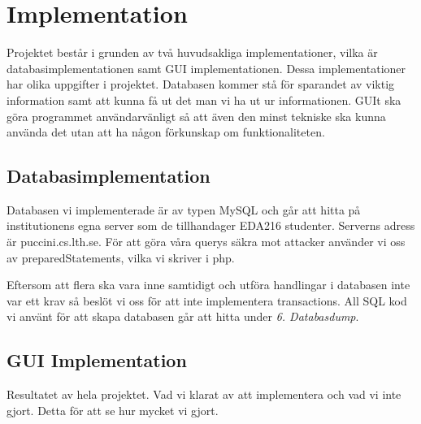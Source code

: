 \section{Implementation}

Projektet består i grunden av två huvudsakliga implementationer, vilka är databasimplementationen samt GUI implementationen. Dessa implementationer har olika uppgifter i projektet. Databasen kommer stå för sparandet av viktig information samt att kunna få ut det man vi ha ut ur informationen. GUIt ska göra programmet användarvänligt så att även den minst tekniske ska kunna använda det utan att ha någon förkunskap om funktionaliteten.

\subsection{Databasimplementation}

Databasen vi implementerade är av typen MySQL och går att hitta på institutionens egna server som de tillhandager EDA216 studenter. Serverns adress är puccini.cs.lth.se. För att göra våra querys säkra mot attacker använder vi oss av preparedStatements, vilka vi skriver i php. 

Eftersom att flera ska vara inne samtidigt och utföra handlingar i databasen inte var ett krav så beslöt vi oss för att inte implementera transactions. All SQL kod vi använt för att skapa databasen går att hitta under \emph{6. Databasdump}.

\subsection{GUI Implementation}



Resultatet av hela projektet. Vad vi klarat av att implementera och vad vi inte gjort. Detta för att se hur mycket vi gjort. 